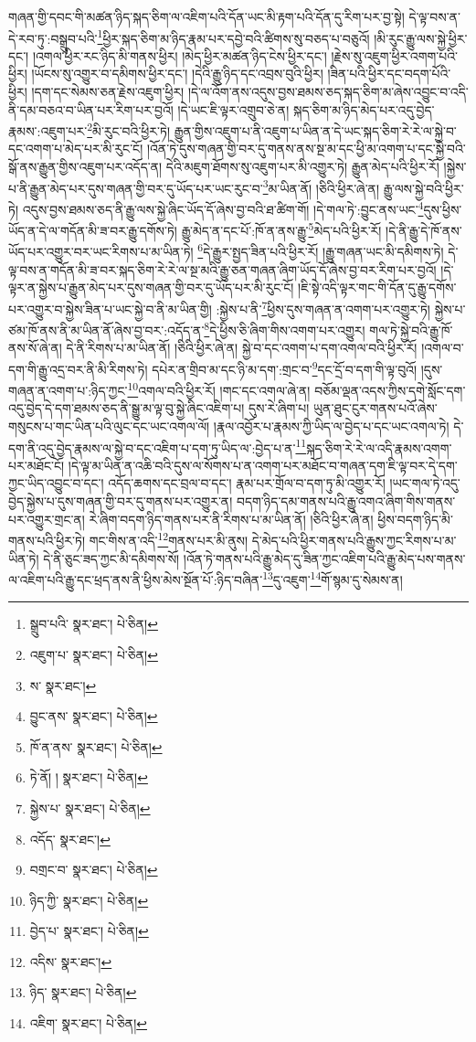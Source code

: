 གཞན་གྱི་དབང་གི་མཚན་ཉིད་སྐད་ཅིག་ལ་འཇིག་པའི་དོན་ཡང་མི་རྟག་པའི་དོན་དུ་རིག་པར་བྱ་སྟེ། དེ་ལྟ་བས་ན་དེ་རབ་ཏུ་:བསྒྲུབ་པའི་\footnote{སྒྲུབ་པའི་  སྣར་ཐང་།  པེ་ཅིན། }ཕྱིར་སྐད་ཅིག་མ་ཉིད་རྣམ་པར་དབྱེ་བའི་ཚིགས་སུ་བཅད་པ་བཅུའོ། །མི་རུང་རྒྱུ་ལས་སྐྱེ་ཕྱིར་དང་། །འགལ་ཕྱིར་རང་ཉིད་མི་གནས་ཕྱིར། །མེད་ཕྱིར་མཚན་ཉིད་ངེས་ཕྱིར་དང་། །རྗེས་སུ་འཇུག་ཕྱིར་འགག་པའི་ཕྱིར། །ཡོངས་སུ་འགྱུར་བ་དམིགས་ཕྱིར་དང་། །དེའི་རྒྱུ་ཉིད་དང་འབྲས་བུའི་ཕྱིར། །ཟིན་པའི་ཕྱིར་དང་བདག་པོའི་ཕྱིར། །དག་དང་སེམས་ཅན་རྗེས་འཇུག་ཕྱིར། །དེ་ལ་འོག་ནས་འདུས་བྱས་ཐམས་ཅད་སྐད་ཅིག་མ་ཞེས་འབྱུང་བ་འདི་ནི་དམ་བཅའ་བ་ཡིན་པར་རིག་པར་བྱའོ། །དེ་ཡང་ཇི་ལྟར་འགྲུབ་ཅེ་ན། སྐད་ཅིག་མ་ཉིད་མེད་པར་འདུ་བྱེད་རྣམས་:འཇུག་པར་\footnote{འཇུག་པ་  སྣར་ཐང་།  པེ་ཅིན། }མི་རུང་བའི་ཕྱིར་ཏེ། རྒྱུན་གྱིས་འཇུག་པ་ནི་འཇུག་པ་ཡིན་ན་དེ་ཡང་སྐད་ཅིག་རེ་རེ་ལ་སྐྱེ་བ་དང་འགག་པ་མེད་པར་མི་རུང་ངོ། །འོན་ཏེ་དུས་གཞན་གྱི་བར་དུ་གནས་ནས་སྔ་མ་དང་ཕྱི་མ་འགག་པ་དང་སྐྱེ་བའི་སྒོ་ནས་རྒྱུན་གྱིས་འཇུག་པར་འདོད་ན། དེའི་མཇུག་ཐོགས་སུ་འཇུག་པར་མི་འགྱུར་ཏེ། རྒྱུན་མེད་པའི་ཕྱིར་རོ། །སྐྱེས་པ་ནི་རྒྱུན་མེད་པར་དུས་གཞན་གྱི་བར་དུ་ཡོད་པར་ཡང་རུང་བ་\footnote{ས་  སྣར་ཐང་། }མ་ཡིན་ནོ། །ཅིའི་ཕྱིར་ཞེ་ན། རྒྱུ་ལས་སྐྱེ་བའི་ཕྱིར་ཏེ། འདུས་བྱས་ཐམས་ཅད་ནི་རྒྱུ་ལས་སྐྱེ་ཞིང་ཡོད་དོ་ཞེས་བྱ་བའི་ཐ་ཚིག་གོ། །དེ་གལ་ཏེ་:བྱུང་ནས་ཡང་\footnote{བྱུང་ནས་  སྣར་ཐང་།  པེ་ཅིན། }དུས་ཕྱིས་ཡོད་ན་དེ་ལ་གདོན་མི་ཟ་བར་རྒྱུ་དགོས་ཏེ། རྒྱུ་མེད་ན་དང་པོ་:ཁོ་ན་ནས་རྒྱུ་\footnote{ཁོ་ན་ནས་  སྣར་ཐང་།  པེ་ཅིན། }མེད་པའི་ཕྱིར་རོ། །དེ་ནི་རྒྱུ་དེ་ཁོ་ནས་ཡོད་པར་འགྱུར་བར་ཡང་རིགས་པ་མ་ཡིན་ཏེ། \footnote{ཏེ་ནོ། །   སྣར་ཐང་།  པེ་ཅིན། }དེ་རྒྱུར་སྤྱད་ཟིན་པའི་ཕྱིར་རོ། །རྒྱུ་གཞན་ཡང་མི་དམིགས་ཏེ། དེ་ལྟ་བས་ན་གདོན་མི་ཟ་བར་སྐད་ཅིག་རེ་རེ་ལ་སྔ་མའི་རྒྱུ་ཅན་གཞན་ཞིག་ཡོད་དོ་ཞེས་བྱ་བར་རིག་པར་བྱའོ། །དེ་ལྟར་ན་སྐྱེས་པ་རྒྱུན་མེད་པར་དུས་གཞན་གྱི་བར་དུ་ཡོད་པར་མི་རུང་ངོ། །ཇི་སྟེ་འདི་ལྟར་གང་གི་དོན་དུ་རྒྱུ་དགོས་པར་འགྱུར་བ་སྐྱེས་ཟིན་པ་ཡང་སྐྱེ་བ་ནི་མ་ཡིན་གྱི། :སྐྱེས་པ་ནི་\footnote{སྐྱེས་པ་  སྣར་ཐང་།  པེ་ཅིན། }ཕྱིས་དུས་གཞན་ན་འགག་པར་འགྱུར་ཏེ། སྐྱེས་པ་ཙམ་ཁོ་ནས་ནི་མ་ཡིན་ནོ་ཞེས་བྱ་བར་:འདོད་ན་\footnote{འདོད་  སྣར་ཐང་། }དེ་ཕྱིས་ཅི་ཞིག་གིས་འགག་པར་འགྱུར། གལ་ཏེ་སྐྱེ་བའི་རྒྱུ་ཁོ་ནས་སོ་ཞེ་ན། དེ་ནི་རིགས་པ་མ་ཡིན་ནོ། །ཅིའི་ཕྱིར་ཞེ་ན། སྐྱེ་བ་དང་འགག་པ་དག་འགལ་བའི་ཕྱིར་རོ། །འགལ་བ་དག་གི་རྒྱུ་འདྲ་བར་ནི་མི་རིགས་ཏེ། དཔེར་ན་གྲིབ་མ་དང་ཉི་མ་དག་:གྲང་བ་\footnote{བགྲང་བ་  སྣར་ཐང་།  པེ་ཅིན། }དང་དྲོ་བ་དག་གི་ལྟ་བུའོ། །དུས་གཞན་ན་འགག་པ་:ཉིད་ཀྱང་\footnote{ཉིད་ཀྱི་  སྣར་ཐང་།  པེ་ཅིན། }འགལ་བའི་ཕྱིར་རོ། །གང་དང་འགལ་ཞེ་ན། བཅོམ་ལྡན་འདས་ཀྱིས་དགེ་སློང་དག་འདུ་བྱེད་དེ་དག་ཐམས་ཅད་ནི་སྒྱུ་མ་ལྟ་བུ་སྐྱེ་ཞིང་འཇིག་པ། དུས་རེ་ཞིག་པ། ཡུན་ཐུང་ངུར་གནས་པའོ་ཞེས་གསུངས་པ་གང་ཡིན་པའི་ལུང་དང་ཡང་འགལ་ལོ། །རྣལ་འབྱོར་པ་རྣམས་ཀྱི་ཡིད་ལ་བྱེད་པ་དང་ཡང་འགལ་ཏེ། དེ་དག་ནི་འདུ་བྱེད་རྣམས་ལ་སྐྱེ་བ་དང་འཇིག་པ་དག་ཏུ་ཡིད་ལ་:བྱེད་པ་ན་\footnote{བྱེད་པ་  སྣར་ཐང་།  པེ་ཅིན། }སྐད་ཅིག་རེ་རེ་ལ་འདི་རྣམས་འགག་པར་མཐོང་ངོ། །དེ་ལྟ་མ་ཡིན་ན་འཆི་བའི་དུས་ལ་སོགས་པ་ན་འགག་པར་མཐོང་བ་གཞན་དག་ཇི་ལྟ་བར་དེ་དག་ཀྱང་ཡིད་འབྱུང་བ་དང་། འདོད་ཆགས་དང་བྲལ་བ་དང་། རྣམ་པར་གྲོལ་བ་དག་ཏུ་མི་འགྱུར་རོ། །ཡང་གལ་ཏེ་འདུ་བྱེད་སྐྱེས་པ་དུས་གཞན་གྱི་བར་དུ་གནས་པར་འགྱུར་ན། བདག་ཉིད་དམ་གནས་པའི་རྒྱུ་འགའ་ཞིག་གིས་གནས་པར་འགྱུར་གྲང་ན། རེ་ཞིག་བདག་ཉིད་གནས་པར་ནི་རིགས་པ་མ་ཡིན་ནོ། །ཅིའི་ཕྱིར་ཞེ་ན། ཕྱིས་བདག་ཉིད་མི་གནས་པའི་ཕྱིར་ཏེ། གང་གིས་ན་འདི་\footnote{འདིས་  སྣར་ཐང་། }གནས་པར་མི་ནུས། དེ་མེད་པའི་ཕྱིར་གནས་པའི་རྒྱུས་ཀྱང་རིགས་པ་མ་ཡིན་ཏེ། དེ་ནི་ཅུང་ཟད་ཀྱང་མི་དམིགས་སོ། །འོན་ཏེ་གནས་པའི་རྒྱུ་མེད་དུ་ཟིན་ཀྱང་འཇིག་པའི་རྒྱུ་མེད་པས་གནས་ལ་འཇིག་པའི་རྒྱུ་དང་ཕྲད་ནས་ནི་ཕྱིས་མེས་སྔོན་པོ་:ཉིད་བཞིན་\footnote{ཉིད་  སྣར་ཐང་།  པེ་ཅིན། }དུ་འཇུག་\footnote{འཇིག་  སྣར་ཐང་།  པེ་ཅིན། }གོ་སྙམ་དུ་སེམས་ན། 